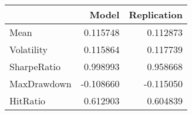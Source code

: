 \begin{tabular}{lrr}
\toprule
{} &     Model &  Replication \\
\midrule
Mean        &  0.115748 &     0.112873 \\
Volatility  &  0.115864 &     0.117739 \\
SharpeRatio &  0.998993 &     0.958668 \\
MaxDrawdown & -0.108660 &    -0.115050 \\
HitRatio    &  0.612903 &     0.604839 \\
\bottomrule
\end{tabular}
